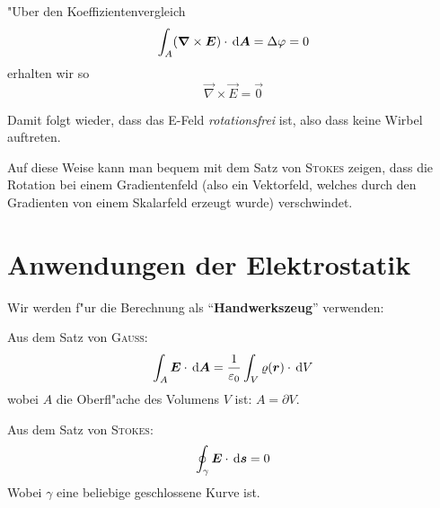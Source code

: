 "Uber den Koeffizientenvergleich
\begin{equation*}
   \int_A (\boldsymbol{\nabla} \times \boldsymbol{E}) \cdot \, \mathrm{d} \boldsymbol{A} = \Delta
   \varphi = 0
\end{equation*}
erhalten wir so
\begin{equation*}
   \vec\nabla \times \vec E = \vec 0
\end{equation*}

\begin{Wichtig}
   Damit folgt wieder, dass das E-Feld \emph{rotationsfrei} ist, also
   dass keine Wirbel auftreten.
\end{Wichtig}

Auf diese Weise kann man bequem mit dem Satz von \textsc{Stokes}
zeigen, dass die Rotation bei einem Gradientenfeld (also ein
Vektorfeld, welches durch den Gradienten von einem Skalarfeld erzeugt
wurde) verschwindet.

















\section{Anwendungen der Elektrostatik}
\label{kap_anwendungen-elektrostatik}




Wir werden f"ur die Berechnung als "`\textbf{Handwerkszeug}"' verwenden:

Aus dem Satz von \textsc{Gauss}:
\begin{equation}
   \label{eqn_gauss-handwerk}
\int_{A} \boldsymbol{E} \cdot \, \mathrm{d} \boldsymbol{A} = \frac{1}{\varepsilon_0} \int_V
\varrho(\boldsymbol{r}) \cdot \, \mathrm{d} V
\end{equation}
wobei $A$ die Oberfl"ache des Volumens $V$ ist: $A = \partial V$.

Aus dem Satz von \textsc{Stokes}:
\begin{equation}
   \label{eqn_stokes-handwerk}
   \oint_\gamma \boldsymbol{E} \cdot \, \mathrm{d} \boldsymbol{s} = 0
\end{equation}
Wobei $\gamma$ eine beliebige geschlossene Kurve ist.




